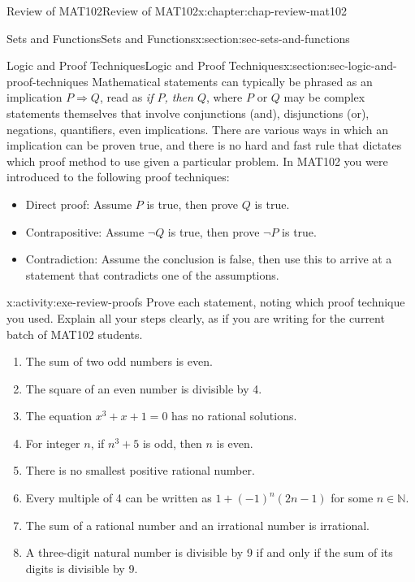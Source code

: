\documentclass[oneside,10pt,]{book}
\numberwithin{equation}{section}
\begin{document}
\begin{chapterptx}{Review of MAT102}{}{Review of MAT102}{}{}{x:chapter:chap-review-mat102}
\begin{sectionptx}{Sets and Functions}{}{Sets and Functions}{}{}{x:section:sec-sets-and-functions}
\end{sectionptx}
%
%
\typeout{************************************************}
\typeout{************************************************}
%
\begin{sectionptx}{Logic and Proof Techniques}{}{Logic and Proof Techniques}{}{}{x:section:sec-logic-and-proof-techniques}
Mathematical statements can typically be phrased as an implication \(P \Rightarrow Q\),  read as \emph{if \(P\), then \(Q\)}, where \(P\) or \(Q\) may be complex statements themselves that involve conjunctions (and), disjunctions (or), negations, quantifiers, even implications. There are various ways in which an implication can be proven true, and there is no hard and fast rule that dictates which proof method to use given a particular problem. In MAT102 you were introduced to the following proof techniques:%
\par
%
\begin{itemize}[label=\textbullet]
\item{}Direct proof: Assume \(P\) is true, then prove \(Q\) is true.%
\item{}Contrapositive: Assume \(\neg Q\) is true, then prove \(\neg P\) is true.%
\item{}Contradiction: Assume the conclusion is false, then use this to arrive at a statement that contradicts one of the assumptions.%
\end{itemize}
%
\begin{activity}{}{x:activity:exe-review-proofs}%
Prove each statement, noting which proof technique you used. Explain all your steps clearly, as if you are writing for the current batch of MAT102 students.%
\begin{enumerate}[label=(\alph*)]
\item{}The sum of two odd numbers is even.%
\item{}The square of an even number is divisible by 4.%
\item{}The equation \(x^3 + x + 1 = 0\) has no rational solutions.%
\item{}For integer \(n\), if \(n^3 + 5\) is odd, then \(n\) is even.%
\item{}There is no smallest positive rational number.%
\item{}Every multiple of 4 can be written as \(1 + (-1)^n(2n-1)\) for some \(n \in \mathbb{N}\).%
\item{}The sum of a rational number and an irrational number is irrational.%
\item{}A three-digit natural number is divisible by 9 if and only if the sum of its digits is divisible by 9.%

\end{enumerate}
\end{activity}
\end{sectionptx}
\end{chapterptx}
\end{document}
